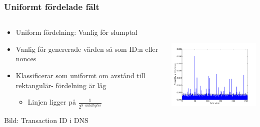 \documentclass[xetex, 8pt]{beamer}
\begin{document}
    \begin{frame}
        \frametitle{Uniformt fördelade fält}
        \begin{columns}[t]
            \begin{column}[T]{6cm}
                \begin{itemize}
                    \item Uniform fördelning: Vanlig för slumptal
                    \item Vanlig för genererade värden så som ID:n eller nonces
                    \item Klassificerar som uniformt om avstånd till 
                        rektangulär- fördelning är låg
                        \begin{itemize}
                            \item Linjen ligger på $\frac{1}{2^{8 \cdot antal bytes}}$
                        \end{itemize}
                \end{itemize}
                Bild: Transaction ID i DNS
            \end{column}
            \begin{column}[T]{6cm}
                \includegraphics[height=5cm]{img/uniform.pdf}
            \end{column}
        \end{columns}
    \end{frame}
\end{document}
